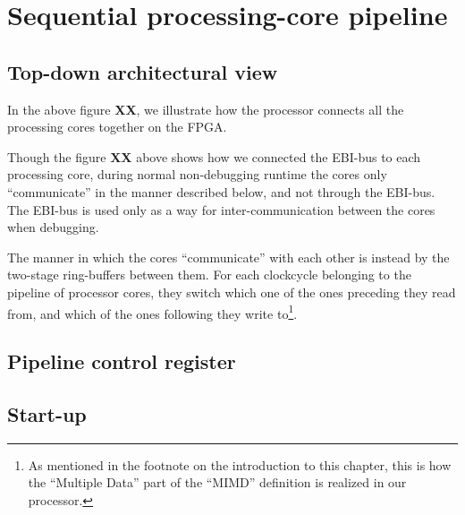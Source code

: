 \FloatBarrier
\section{Sequential processing-core pipeline}\label{section:sequential-pipeline}

\FloatBarrier
\subsection{Top-down architectural view}


In the above figure \textbf{XX}, we
illustrate how the processor connects all the processing cores together on the
FPGA.

Though the figure \textbf{XX}
above shows how we connected the EBI-bus\cite{efm_ebi} to each processing core,
during normal non-debugging runtime the cores only ``communicate'' in the manner
described below, and not through the EBI-bus. The EBI-bus is used only as a way
for inter-communication between the cores when debugging.

The manner in which the cores ``communicate'' with each other is instead by the
two-stage ring-buffers between them. For each clockcycle belonging to the
pipeline of processor cores, they switch which one of the ones preceding they
read from, and which of the ones following they write to\footnote{As mentioned
in the footnote on the introduction to this chapter, this is how the ``Multiple
Data'' part of the ``MIMD'' definition is realized in our processor.}.

\FloatBarrier
\subsection{Pipeline control register}\label{subsection:fpga-pipeline-startup}


\subsection{Start-up}\label{subsection:fpga-pipeline-startup}

